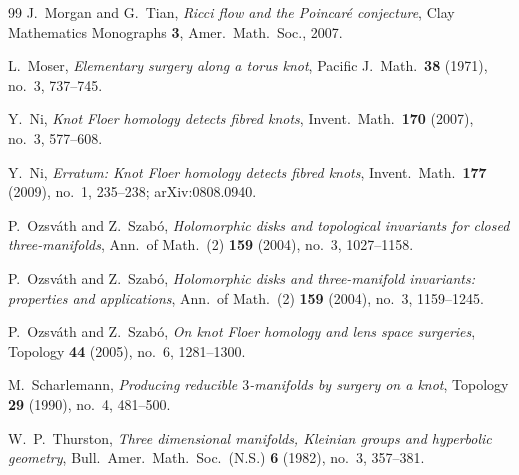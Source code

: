 \documentclass[12pt]{article}
\theoremstyle{definition}
\theoremstyle{remark}
\begin{document}
\begin{thebibliography}{99}
J.~Morgan and G.~Tian,
\emph{Ricci flow and the Poincar\'e conjecture},
Clay Mathematics Monographs \textbf{3}, Amer.\ Math.\ Soc., 2007.

L.~Moser,
\emph{Elementary surgery along a torus knot},
Pacific J.\ Math.\ \textbf{38} (1971), no.~3, 737--745.

Y.~Ni,
\emph{Knot Floer homology detects fibred knots},
Invent.\ Math.\ \textbf{170} (2007), no.~3, 577--608.

Y.~Ni,
\emph{Erratum: Knot Floer homology detects fibred knots},
Invent.\ Math.\ \textbf{177} (2009), no.~1, 235--238; arXiv:0808.0940.

P.~Ozsv\'ath and Z.~Szab\'o,
\emph{Holomorphic disks and topological invariants for closed
three-manifolds},
Ann.\ of Math.\ (2) \textbf{159} (2004), no.~3, 1027--1158.

P.~Ozsv\'ath and Z.~Szab\'o,
\emph{Holomorphic disks and three-manifold invariants: properties and
applications},
Ann.\ of Math.\ (2) \textbf{159} (2004), no.~3, 1159--1245.

P.~Ozsv\'ath and Z.~Szab\'o,
\emph{On knot Floer homology and lens space surgeries},
Topology \textbf{44} (2005), no.~6, 1281--1300.

M.~Scharlemann,
\emph{Producing reducible \(3\)-manifolds by surgery on a knot},
Topology \textbf{29} (1990), no.~4, 481--500.

W.~P.~Thurston,
\emph{Three dimensional manifolds, Kleinian groups and hyperbolic
geometry},
Bull.\ Amer.\ Math.\ Soc.\ (N.S.) \textbf{6} (1982), no.~3, 357--381.

\end{thebibliography}
\end{document}
